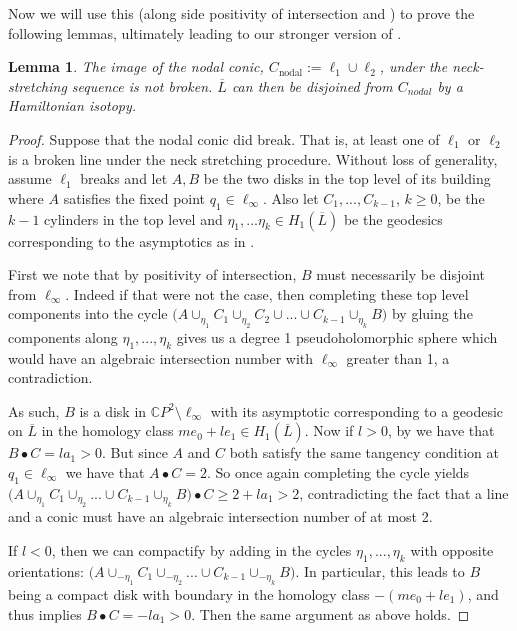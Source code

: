 \documentclass[10pt]{amsart}
\theoremstyle{plain}
\newtheorem{lemma}[thm]{Lemma}
\theoremstyle{definition}
\numberwithin{equation}{section}
\newcommand{\C}{\mathbb{C}}
\newcommand{\sm}{\setminus}
\begin{document}
Now we will use this (along side positivity of intersection and ) to prove the following lemmas, ultimately leading to our stronger version of . 

\begin{lemma}\label{lem:nodaldoesntbreak}
    The image of the nodal conic, $C_\text{nodal}:=\ell_1\cup \ell_2$, under the neck-stretching sequence is not broken. $\overline{L}$ can then be disjoined from $C_{nodal}$ by a Hamiltonian isotopy.
\end{lemma}

\begin{proof}
    Suppose that the nodal conic did break. That is, at least one of $\ell_1$ or $\ell_2$ is a broken line under the neck stretching procedure. Without loss of generality, assume $\ell_1$ breaks and let $A,B$ be the two disks in the top level of its building where $A$ satisfies the fixed point $q_1\in \ell_\infty$. Also let $C_1,...,C_{k-1}$, $k\geq 0$, be the $k-1$ cylinders in the top level and $\eta_1,...\eta_{k} \in H_1(\overline{L})$ be the geodesics corresponding to the asymptotics as in . 
    
    First we note that by positivity of intersection, $B$ must necessarily be disjoint from $\ell_\infty$. Indeed if that were not the case, then completing these top level components into the cycle $\big(A\cup_{\eta_1} C_1 \cup_{\eta_2} C_2\cup ... \cup C_{k-1} \cup_{\eta_{k}} B\big)$ by gluing the components along $\eta_1,...,\eta_k$ gives us a degree 1 pseudoholomorphic sphere which would have an algebraic intersection number with $\ell_\infty$ greater than 1, a contradiction.

    As such, $B$ is a disk in $\C P^2\sm \ell_\infty$ with its asymptotic corresponding to a geodesic on $\overline{L}$ in the homology class $me_0+le_1\in H_1(\overline{L})$. Now if $l> 0$, by  we have that $B\bullet C = la_1>0$. But since $A$ and $C$ both satisfy the same tangency condition at $q_1\in \ell_\infty$ we have that $A\bullet C = 2$. So once again completing the cycle yields $\big(A\cup_{\eta_1} C_1 \cup_{\eta_2} ... \cup C_{k-1} \cup_{\eta_{k}} B\big)\bullet C \geq 2+la_1>2$, contradicting the fact that a line and a conic must have an algebraic intersection number of at most 2.

    If $l<0$, then we can compactify by adding in the cycles $\eta_1,...,\eta_k$ with opposite orientations: $\big(A\cup_{-\eta_1} C_1 \cup_{-\eta_2} ... \cup C_{k-1} \cup_{-\eta_{k}} B\big)$. In particular, this leads to $B$ being a compact disk with boundary in the homology class $-(me_0+le_1)$, and thus  implies $B\bullet C=-la_1>0$. Then the same argument as above holds.


\end{proof}
\end{document}
